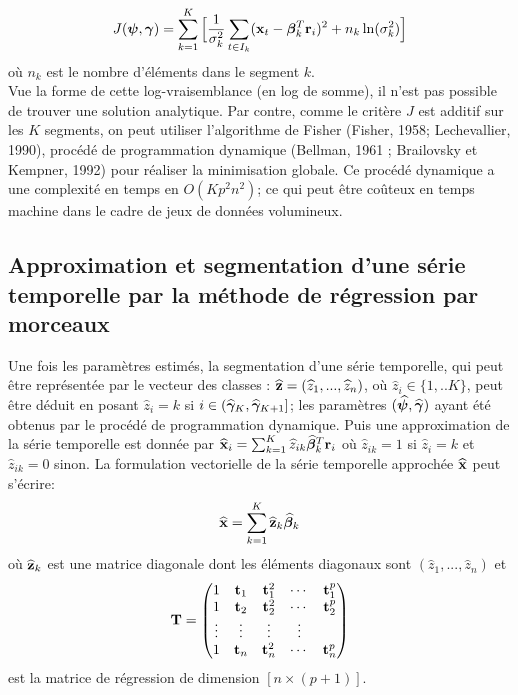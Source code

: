 \documentclass[12pt]{article}
\begin{document}
\begin{equation}
J(\boldsymbol{\psi},\boldsymbol{\gamma}) =  \sum_{k=1}^{K} \Big[ \frac{1}{\sigma^2_{k}} \sum_{t \in I_k} ({\mathbf{x}}_{t}-\boldsymbol{\beta}^{T}_{k}\mathbf{r}_{i})^2 + n_{k}\ln (\sigma^2_{k}) \Big]
\label{eq:Hyp3}
\end{equation}  
où $n_{k}$ est le nombre d'éléments dans le segment $k$.\\
Vue la forme de cette log-vraisemblance (en log de somme), il n'est pas possible de trouver une solution analytique. Par contre, comme le critère $J$ est additif sur les $K$ segments, on peut utiliser l'algorithme de Fisher (Fisher, 1958; Lechevallier, 1990), procédé de programmation dynamique (Bellman, 1961 ; Brailovsky et Kempner, 1992) pour réaliser la minimisation globale. Ce procédé dynamique a une complexité en temps en $O(Kp^2n^2)$; ce qui peut être coûteux en temps machine dans le cadre de jeux de données volumineux. 

\smallbreak
\subsection{Approximation et segmentation d'une série temporelle par la méthode de régression par morceaux}
\label{ssec: 2-3}
\smallbreak
Une fois les paramètres estimés, la segmentation d'une série temporelle, qui peut être représentée par le vecteur des classes :  
$\widehat{\mathbf{z}}=( \widehat{z}_1,...,\widehat{z}_n)$, où $\widehat{z}_i \in \{1,..K\}$, peut être déduit en posant $\widehat{z}_i = k$ si $i \in (\widehat{\boldsymbol{\gamma}}_{K},\widehat{\boldsymbol{\gamma}}_{K+1}]$; les paramètres  $(\widehat{\boldsymbol{\psi}},\widehat{\boldsymbol{\gamma}})$ ayant été obtenus par le procédé de programmation dynamique.
Puis une approximation de la série temporelle est donnée par $\widehat{{\mathbf{x}}}_{i}=\sum_{k=1}^{K} \widehat{z}_{ik}\widehat{\boldsymbol{\beta}}^{T}_{k}\mathbf{r}_{i}$ où $\widehat{z}_{ik}=1$ si $\widehat{z}_{i}=k$ et $\widehat{z}_{ik}=0$ sinon. La formulation vectorielle de la série temporelle approchée $\widehat{{\mathbf{x}}}$ peut s'écrire: 
\begin{equation}
\widehat{{\mathbf{x}}}=\sum_{k=1}^{K} \widehat{\mathbf{z}}_{k}\widehat{\boldsymbol{\beta}}_{k}
\label{eq:Hyp4}
\end{equation}  
où $ \widehat{\mathbf{z}}_{k}$ est une matrice diagonale dont les éléments diagonaux sont $( \widehat{z}_1,...,\widehat{z}_n)$ et 
$$
\mathbf{T}=\begin{pmatrix}
   1 & \mathbf{t}_{1} & \mathbf{t}^2_{1} & \cdots & \mathbf{t}^p_{1} \\
   1 & \mathbf{t}_{2} & \mathbf{t}^2_{2} & \cdots & \mathbf{t}^p_{2}  \\
   \vdots & \vdots &\vdots &\vdots\\
   1 & \mathbf{t}_{n} & \mathbf{t}^2_{n} & \cdots & \mathbf{t}^p_{n}  
\end{pmatrix}
$$
est la matrice de régression de dimension $[n\times(p+1)]$.
\end{document}
